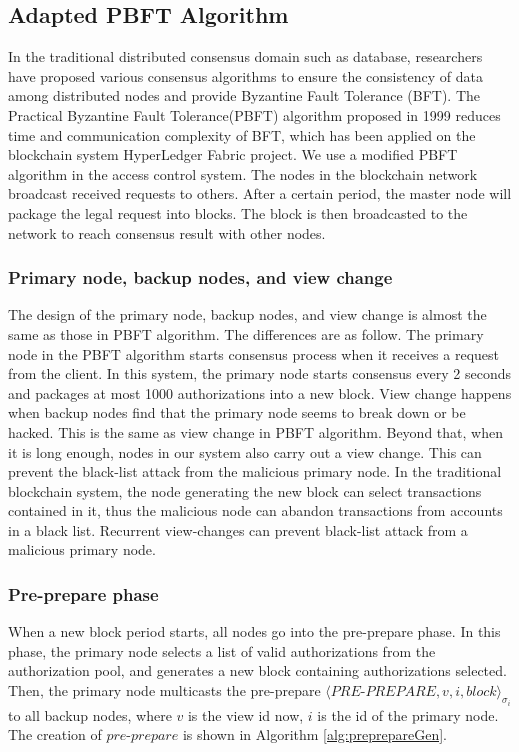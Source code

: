 \subsection{Adapted PBFT Algorithm}

In the traditional distributed consensus domain such as database, researchers have proposed various consensus algorithms to ensure the consistency of data among distributed nodes and provide Byzantine Fault Tolerance (BFT). The Practical Byzantine Fault Tolerance(PBFT) algorithm proposed in 1999 reduces time and communication complexity of BFT, which has been applied on the blockchain system HyperLedger Fabric project. We use a modified PBFT algorithm in the access control system. The nodes in the blockchain network broadcast received requests to others. After a certain period, the master node will package the legal request into blocks. The block is then broadcasted to the network to reach consensus result with other nodes.

\subsubsection{Primary node, backup nodes, and view change}

The design of the primary node, backup nodes, and view change is almost the same as those in PBFT algorithm. The differences are as follow. The primary node in the PBFT algorithm starts consensus process when it receives a request from the client. In this system, the primary node starts consensus every 2 seconds and packages at most 1000 authorizations into a new block. View change happens when backup nodes find that the primary node seems to break down or be hacked. This is the same as view change in PBFT algorithm. Beyond that, when it is long enough, nodes in our system also carry out a view change. This can prevent the black-list attack from the malicious primary node. In the traditional blockchain system, the node generating the new block can select transactions contained in it, thus the malicious node can abandon transactions from accounts in a black list. Recurrent view-changes can prevent black-list attack from a malicious primary node.

\subsubsection{Pre-prepare phase}

When a new block period starts, all nodes go into the pre-prepare phase. In this phase, the primary node selects a list of valid authorizations from the authorization pool, and generates a new block containing authorizations selected. Then, the primary node multicasts the pre-prepare $\langle PRE$-$PREPARE, v, i, block \rangle_{\sigma_{i}}$ to all backup nodes, where $v$ is the view id now, $i$ is the id of the primary node. The creation of $pre$-$prepare$ is shown in Algorithm \ref{alg:preprepareGen}.

